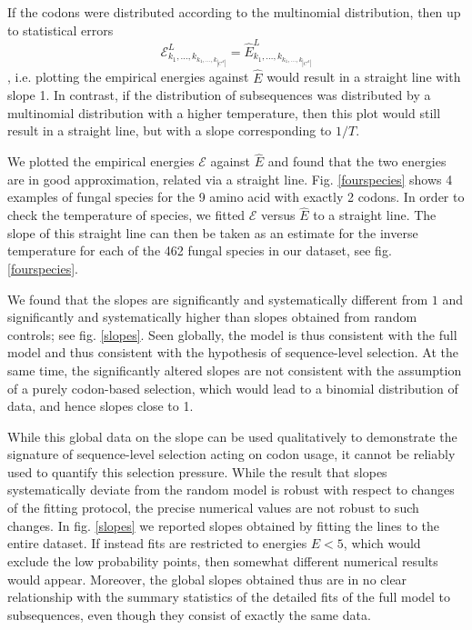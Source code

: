 \documentclass[a4paper,10pt]{paper}%
\begin{document}
%
\par
If the codons were distributed according to the multinomial distribution, then  up to statistical errors 
%
% 
\begin{displaymath}
\mathcal E^L_{k_1,\ldots,k_{k_1,\ldots, k_{|C^\mathcal A|}}}= \hat E^L_{k_1,\ldots, k_{k_1,\ldots, k_{|C^\mathcal A|}}}
\end{displaymath}
%
% 
, i.e. plotting the empirical energies against  $\hat E$ would result in a straight line with slope 1.  In contrast,  if  the distribution of subsequences was distributed by a multinomial distribution with a higher temperature, then this plot would still result in a straight line, but with a slope corresponding to $1/T$. 
\par
We plotted the empirical energies $\mathcal E$ against $\hat E$ and found that  the two energies are in good approximation, related via a straight line. Fig. \ref{fourspecies} shows 4 examples of fungal species for the 9 amino acid with exactly 2 codons.  In order to check the temperature of species, we fitted     $\mathcal E$ versus $\hat E$  to a straight line. The slope of this straight line can then be taken as an estimate for the inverse temperature  for each of the 462 fungal species in our dataset, see fig. \ref{fourspecies}.
\par
We  found that the slopes are significantly and systematically different from $1$ and significantly and systematically higher than slopes obtained from random controls; see  fig. \ref{slopes}. Seen globally, the model is thus consistent with the full model and thus consistent with the hypothesis of sequence-level selection. At the same time, the significantly altered slopes are not consistent with the assumption of a purely codon-based selection, which would lead to a binomial distribution of data, and hence slopes close to 1.  
\par
While this global data on the slope can be used qualitatively to demonstrate the signature of sequence-level selection acting on codon usage, it  cannot be reliably used to quantify this selection pressure. While the result that slopes systematically deviate from the random model is robust with respect to changes of the fitting protocol, the precise numerical values are not robust to such changes. In fig. \ref{slopes} we reported slopes obtained by fitting the lines to the entire dataset. If instead  fits are restricted to energies $\hat E< 5$, which would exclude  the low probability points, then somewhat different numerical results would appear. Moreover, the global slopes obtained thus are in no clear relationship with the summary statistics of the detailed fits of the full model to subsequences, even though they consist of exactly the same data.
 
\end{document}
